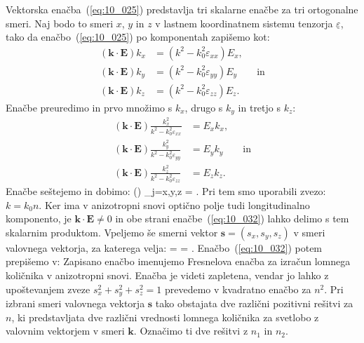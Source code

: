 Vektorska enačba~(\ref{eq:10_025}) predstavlja tri skalarne enačbe za tri 
ortogonalne smeri. Naj bodo to smeri $x$, $y$ in $z$ v lastnem koordinatnem sistemu
tenzorja $\underline{\varepsilon}$, tako da enačbo~(\ref{eq:10_025}) po komponentah 
zapišemo kot:
\begin{align}
\left(\mathbf{k}\cdot \mathbf{E}\right) k_x &= 
\left( k^2 -k_0^2 \varepsilon_{xx}\right) E_x, \label{eq:10_026}\\
\left(\mathbf{k}\cdot \mathbf{E}\right) k_y &= 
\left( k^2 -k_0^2 \varepsilon_{yy}\right) E_y \qquad \mathrm{in}\label{eq:10_027}\\
\left(\mathbf{k}\cdot \mathbf{E}\right) k_z &= \left( k^2 -k_0^2 \varepsilon_{zz}\right) E_z.
\label{eq:10_028}
\end{align}
Enačbe preuredimo in prvo množimo s $k_x$, drugo s $k_y$ in tretjo s $k_z$:
\begin{align}
\left(\mathbf{k}\cdot \mathbf{E}\right) 
\frac{k_x^2}{k^2 - k_0^2 \varepsilon_{xx}} &= E_x k_x, \label{eq:10_029}\\
\left(\mathbf{k}\cdot \mathbf{E}\right) 
\frac{k_y^2}{k^2 - k_0^2 \varepsilon_{yy}} &= E_y k_y \qquad \mathrm{in} \label{eq:10_030}\\
\left(\mathbf{k}\cdot \mathbf{E}\right) 
\frac{k_z^2}{k^2 - k_0^2 \varepsilon_{zz}} &= E_z k_z. \label{eq:10_031}
\end{align}
Enačbe seštejemo in dobimo:
\beq
\left(\cdot {}\right)  
\sum_{j=x,y,z} 
 = \cdot {}.
\label{eq:10_032}
\eeq
Pri tem smo uporabili zvezo: $k = k_0 n$. Ker ima v anizotropni snovi 
optično polje tudi longitudinalno komponento, je $\mathbf{k}\cdot 
\mathbf{E} \neq 0$ in obe strani enačbe~(\ref{eq:10_032}) lahko 
delimo s tem skalarnim produktom.
Vpeljemo še smerni vektor $\mathbf{s} = (s_x, s_y, s_z)$ v smeri valovnega vektorja, 
za katerega velja:
\beq
{} =  = .
\label{eq:10_033}
\eeq
Enačbo~(\ref{eq:10_032}) potem prepišemo v:
Zapisano enačbo imenujemo Fresnelova enačba za izračun lomnega 
količnika v anizotropni snovi. Enačba je videti 
zapletena, vendar jo lahko z upoštevanjem zveze 
$s_x^2+s_y^2+s_z^2 = 1$ prevedemo v kvadratno enačbo za $n^2$.
Pri izbrani smeri valovnega vektorja $\mathbf{s}$ tako
obstajata dve različni pozitivni rešitvi za $n$, ki 
predstavljata dve različni vrednosti lomnega količnika za
svetlobo z valovnim vektorjem v smeri $\mathbf{k}$.
Označimo ti dve rešitvi z $n_1$ in $n_2$. 

